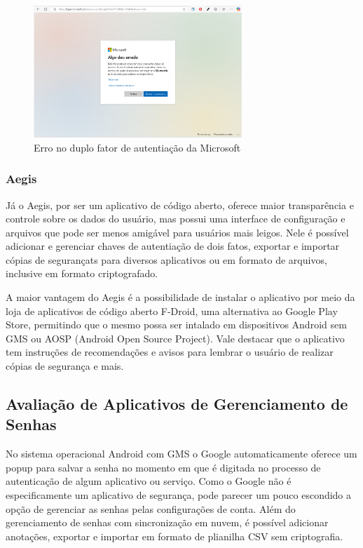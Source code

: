 \documentclass[12pt]{article}
\begin{document}
\begin{figure}[h!]
  \centering
  \includegraphics[width=0.7\textwidth]{./assets/microsoft_error_2.png}
  \caption{Erro no duplo fator de autentiação da Microsoft}
  \label{fig:Microsoft2FactoryAutenticatorError}
\end{figure}

\subsubsection{Aegis}

Já o Aegis, por ser um aplicativo de código aberto, oferece maior transparência
e controle sobre os dados do usuário, mas possui uma interface de configuração
e arquivos que pode ser menos amigável para usuários mais leigos.
Nele é possível adicionar e gerenciar chaves de autentiação de dois fatos,
exportar e importar cópias de segurançats para diversos aplicativos ou em formato de arquivos,
inclusive em formato criptografado.

A maior vantagem do Aegis é a possibilidade de instalar o aplicativo por meio da
loja de aplicativos de código aberto F-Droid, uma alternativa ao Google Play
Store, permitindo que o mesmo possa ser intalado em dispositivos Android sem GMS
ou AOSP (Android Open Source Project).
Vale destacar que o aplicativo tem instruções de recomendações e avisos para lembrar o usuário
de realizar cópias de segurança e mais.

\subsection{Avaliação de Aplicativos de Gerenciamento de Senhas}

No sistema operacional Android com GMS o Google automaticamente oferece um popup
para salvar a senha no momento em que é digitada no processo de autenticação de
algum aplicativo ou serviço.
Como o Google não é especificamente um aplicativo de segurança, pode parecer um
pouco escondido a opção de gerenciar as senhas pelas configurações de conta.
Além do gerenciamento de senhas com sincronização em nuvem, é possível adicionar
anotações, exportar e importar em formato de plianilha CSV sem criptografia.
\end{document}
